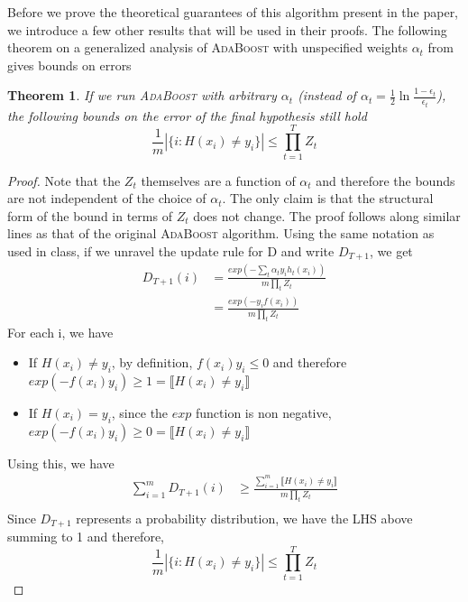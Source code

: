 \documentclass[11pt]{article}
\newtheorem{theorem}{Theorem}
\begin{document}
Before we prove the theoretical guarantees of this algorithm present in the paper, we introduce a few other results that will be used in their proofs. 
The following theorem on a generalized analysis of \textsc{AdaBoost} with unspecified weights $\alpha_t$ from  \cite{Schapire:1999:IBA:337859.337870} gives bounds on errors
\begin{theorem}
If we run \textsc{AdaBoost} with arbitrary $\alpha_t$ (instead of $\alpha_t = \frac{1}{2} \ln \frac{1-\epsilon_t}{\epsilon_t}$), the following bounds on the error of the final hypothesis still hold
$$\frac{1}{m}|\{i : H(x_i) \neq y_i\}| \le \prod_{t=1}^T Z_t$$
\end{theorem}
\begin{proof}
Note that the $Z_t$ themselves are a function of $\alpha_t$ and therefore the bounds are not independent of the choice of $\alpha_t$. The only claim is that the structural form of the bound in terms of $Z_t$ does not change.
The proof follows along similar lines as that of the original \textsc{AdaBoost} algorithm. Using the same notation as used in class, if we unravel the update rule for D and write $D_{T+1}$, we get
\begin{align*}
D_{T+1}(i) &= \frac{exp(-\sum_t \alpha_t y_i h_t(x_i))}{m\prod_t Z_t}\\
&= \frac{exp(-y_i f(x_i))}{m \prod_t Z_t}
\end{align*}
For each i, we have
\begin{itemize}
\item If $H(x_i) \neq y_i$, by definition, $f(x_i) y_i \leq 0$ and therefore $exp(-f(x_i) y_i) \ge 1 = \llbracket H(x_i) \neq y_i \rrbracket$
\item If $H(x_i) = y_i$, since the $exp$ function is non negative, $exp(-f(x_i) y_i) \ge 0 = \llbracket H(x_i) \neq y_i \rrbracket$
\end{itemize}
Using this, we have
\begin{align*}
\sum_{i=1}^m D_{T+1}(i) &\ge \frac{\sum_{i=1}^m \llbracket H(x_i) \neq y_i \rrbracket}{m\prod_t Z_t}\\ 
\end{align*}
Since $D_{T+1}$ represents a probability distribution, we have the LHS above summing to 1 and therefore,
$$\frac{1}{m}|\{i : H(x_i) \neq y_i\}| \le \prod_{t=1}^T Z_t$$
\end{proof}
\end{document}
